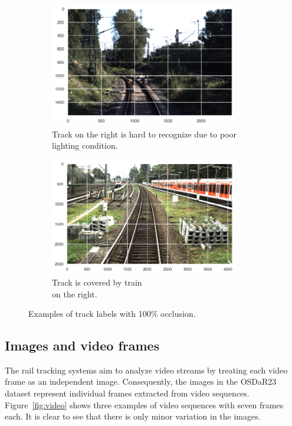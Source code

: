\documentclass[Master,MDS,english]{BASE/twbook} %
\begin{document}
\begin{figure}
\centering
\begin{subfigure}[t]{.5\textwidth}
  \centering
  \includegraphics[width=0.9\textwidth]{images/datasets/db/occlusion_example1}
  \caption{Track on the right is hard to recognize due to poor lighting condition.}
\end{subfigure}%
\begin{subfigure}[t]{.5\textwidth}
  \centering
  \includegraphics[width=0.9\textwidth]{images/datasets/db/occlusion_example2}
  \caption{Track is covered by train \\ on the right. }
\end{subfigure}
\caption{Examples of track labels with 100\% occlusion.}
\label{fig:occlusion_examples}
\end{figure}


\subsection{Images and video frames}

The rail tracking systems aim to analyze video streams by treating each video frame as an independent image. Consequently, the images in the OSDaR23 dataset represent individual frames extracted from video sequences. 	Figure~\ref{fig:video} shows three examples of video sequences with seven frames each. It is clear to see that there is only minor variation in the images.
\end{document}
